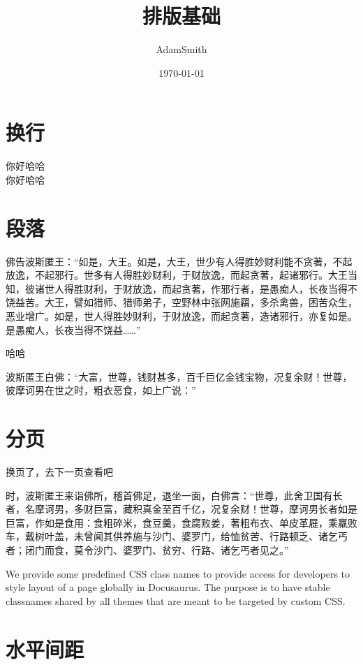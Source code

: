 \documentclass{article}
\title{排版基础}
\author{AdamSmith}
\date{\today}
\begin{document}
    \maketitle %
    
    \tableofcontents %

    \section{换行}

    你好哈哈    \\
    你好哈哈    
    
    \section{段落}

    佛告波斯匿王：“如是，大王。如是，大王，世少有人得胜妙财利能不贪著，不起放逸，不起邪行。世多有人得胜妙财利，于财放逸，而起贪著，起诸邪行。大王当知，彼诸世人得胜财利，于财放逸，而起贪著，作邪行者，是愚痴人，长夜当得不饶益苦。大王，譬如猎师、猎师弟子，空野林中张网施羂，多杀禽兽，困苦众生，恶业增广。如是，世人得胜妙财利，于财放逸，而起贪著，造诸邪行，亦复如是。是愚痴人，长夜当得不饶益……”
    \par 哈哈\par
    波斯匿王白佛：“大富，世尊，钱财甚多，百千巨亿金钱宝物，况复余财！世尊，彼摩诃男在世之时，粗衣恶食，如上广说：”


    \section{分页}
    换页了，去下一页查看吧
    \pagebreak

    时，波斯匿王来诣佛所，稽首佛足，退坐一面，白佛言：“世尊，此舍卫国有长者，名摩诃男，多财巨富，藏积真金至百千亿，况复余财！世尊，摩诃男长者如是巨富，作如是食用：食粗碎米，食豆羹，食腐败姜，著粗布衣、单皮革屣，乘羸败车，戴树叶盖，未曾闻其供养施与沙门、婆罗门，给恤贫苦、行路顿乏、诸乞丐者；闭门而食，莫令沙门、婆罗门、贫穷、行路、诸乞丐者见之。”
    
    We provide some predefined CSS class names to provide access for developers to style layout of a page globally in Docusaurus. The purpose is to have stable classnames shared by all themes that are meant to be targeted by custom CSS.
    
    \section{水平间距}
\end{document}
